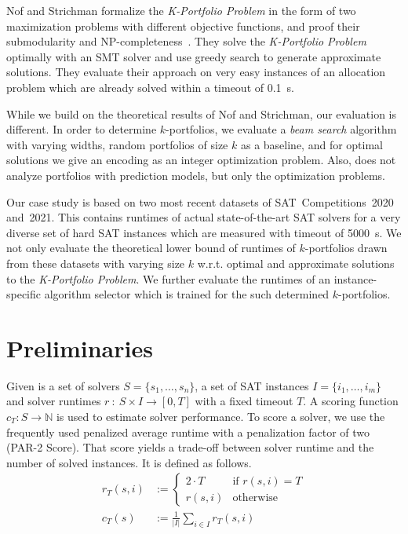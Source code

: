 \documentclass[conference]{IEEEtran}
\begin{document}
Nof and Strichman formalize the \emph{K-Portfolio Problem} in the form of two maximization problems with different objective functions, and proof their submodularity and NP-completeness~\cite{nof2020real}. 
They solve the \emph{K-Portfolio Problem} optimally with an SMT solver and use greedy search to generate approximate solutions. 
They evaluate their approach on very easy instances of an allocation problem which are already solved within a timeout of 0.1~s.%

While we build on the theoretical results of Nof and Strichman, our evaluation is different.
In order to determine $k$-portfolios, we evaluate a \emph{beam search} algorithm with varying widths, random portfolios of size $k$ as a baseline, and for optimal solutions we give an encoding as an integer optimization problem.
Also, \cite{nof2020real} does not analyze portfolios with prediction models, but only the optimization problems.

Our case study is based on two most recent datasets of SAT~Competitions~2020 and~2021.
This contains runtimes of actual state-of-the-art SAT solvers for a very diverse set of hard SAT instances which are measured with timeout of 5000~s.
We not only evaluate the theoretical lower bound of runtimes of $k$-portfolios drawn from these datasets with varying size $k$ w.r.t. optimal and approximate solutions to the \emph{K-Portfolio Problem}. 
We further evaluate the runtimes of an instance-specific algorithm selector which is trained for the such determined $k$-portfolios. 

\section{Preliminaries}
\label{sec:preliminaries}

Given is a set of solvers $S = \{s_1, \dots, s_n\}$, a set of SAT instances $I = \{i_1, \dots, i_m\}$ and solver runtimes $r~:~S \times I \rightarrow [0, T]$ with a fixed timeout $T$.
A scoring function $c_T : S \rightarrow \mathbb{N}$ is used to estimate solver performance. 
To score a solver, we use the frequently used penalized average runtime with a penalization factor of two (PAR-2 Score). 
That score yields a trade-off between solver runtime and the number of solved instances.
It is defined as follows.%
\begin{align}
r_T(s,i) &:= \begin{cases}
	2 \cdot T & \text{if }r(s,i) = T\\
	r(s,i) & \text{otherwise}
\end{cases} \tag*{Penalized Runtimes}\\[.5em]
c_T(s) &:= \frac{1}{|I|} \sum_{i \in I}{r_T(s,i)} \tag*{PAR-2 Score}
\end{align}
\end{document}
